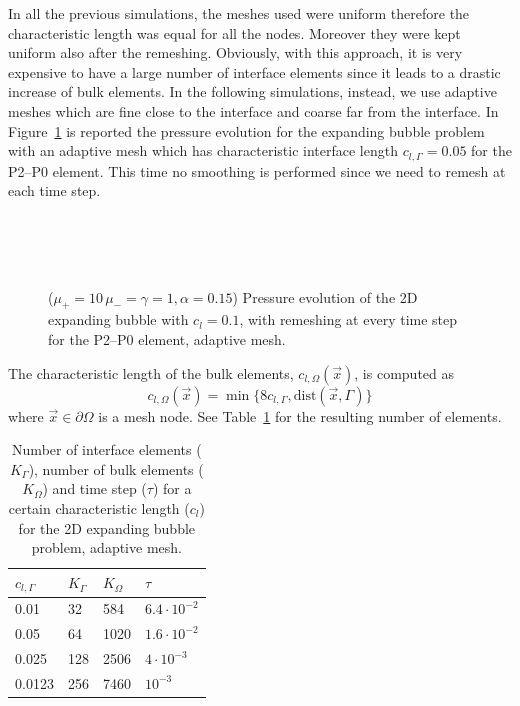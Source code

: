 \documentclass[a4paper,12pt,onecolumn]{article}
\begin{document}
In all the previous simulations, the meshes used were uniform therefore the characteristic length was equal for all the nodes. Moreover they were kept uniform also after the remeshing. Obviously, with this approach, it is very expensive to have a large number of interface elements since it leads to a drastic increase of bulk elements. In the following simulations, instead, we use adaptive meshes which are fine close to the interface and coarse far from the interface. In Figure~\ref{fig:expanding_bubble_adaptive} is reported the pressure evolution for the expanding bubble problem with an adaptive mesh which has characteristic interface length $c_{l,\Gamma}=0.05$ for the P2--P0 element. This time no smoothing is performed since we need to remesh at each time step.
\begin{figure}[htbp]
  \centering
  \\
  \quad
  \\
  \quad
  \\
  \caption{($\mu_+ = 10\,\mu_- = \gamma = 1,\alpha = 0.15$) Pressure evolution of the 2D expanding bubble with $c_l=0.1$, with remeshing at every time step for the P2--P0 element, adaptive mesh.}
  \label{fig:expanding_bubble_adaptive}
\end{figure}

The characteristic length of the bulk elements, $c_{l,\Omega}(\vec{x})$, is computed as
\begin{equation}\label{eq:adaptive_criteria}
 c_{l,\Omega}(\vec{x})=\min\big\{8c_{l,\Gamma},\textrm{dist}(\vec{x},\Gamma)\big\}
\end{equation}
where $\vec{x}\in\partial\Omega$ is a mesh node. See Table~\ref{tab:expandingbubble2Delements_adaptive} for the resulting number of elements. 
\begin{table}
 \center
\begin{tabular}{llll}
\hline
$c_{l,\Gamma}$ & $K_\Gamma$ & $K_\Omega$ & $\tau$ \\
\hline
0.01 & 32 & 584 & $6.4\cdot10^{-2}$ \\
0.05 & 64 & 1020 & $1.6\cdot10^{-2}$ \\
0.025 & 128 & 2506 & $4\cdot10^{-3}$\\
0.0123 & 256 & 7460 & $10^{-3}$\\
\hline
\end{tabular}
\caption{Number of interface elements ($K_\Gamma$), number of bulk elements ($K_\Omega$) and time step ($\tau$) for a certain characteristic length ($c_l$) for the 2D expanding bubble problem, adaptive mesh.}
\label{tab:expandingbubble2Delements_adaptive}
\end{table}
\end{document}
